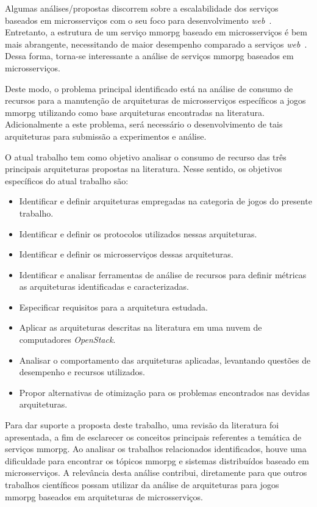Algumas análises/propostas discorrem sobre a escalabilidade dos serviços baseados em microsserviços com o seu foco para desenvolvimento \textit{web}~\cite{photon_engine, mmorpg_culture, DiFrancesco2017Apr}.
%
Entretanto, a estrutura de um serviço \ac{mmorpg} baseado em microsserviços é bem mais abrangente, necessitando de maior desempenho comparado a serviços \textit{web}~\cite{photon_engine, mmorpg_culture}.
%
Dessa forma, torna-se interessante a análise de serviços \ac{mmorpg} baseados em microsserviços.



Deste modo, o problema principal identificado está na análise de consumo de recursos para a manutenção de arquiteturas de microsserviços específicos a jogos \ac{mmorpg} utilizando como base arquiteturas encontradas na literatura.
%
Adicionalmente a este problema, será necessário o desenvolvimento de tais arquiteturas para submissão a experimentos e análise.

O atual trabalho tem como objetivo analisar o consumo de recurso das três principais arquiteturas propostas na literatura.
%
Nesse sentido, os objetivos específicos do atual trabalho são:

\begin{itemize}
    \item Identificar e definir arquiteturas empregadas na categoria de jogos do presente trabalho.
    \item Identificar e definir os protocolos utilizados nessas arquiteturas.
    \item Identificar e definir os microsserviços dessas arquiteturas.
    \item Identificar e analisar ferramentas de análise de recursos para definir métricas as arquiteturas identificadas e caracterizadas.
    \item Especificar requisitos para a arquitetura estudada.
    \item Aplicar as arquiteturas descritas na literatura em uma nuvem de computadores \textit{OpenStack}.
    \item Analisar o comportamento das arquiteturas aplicadas, levantando questões de desempenho e recursos utilizados.
    \item Propor alternativas de otimização para os problemas encontrados nas devidas arquiteturas.
\end{itemize}


Para dar suporte a proposta deste trabalho, uma revisão da literatura foi apresentada, a fim de esclarecer os conceitos principais referentes a temática de serviços \ac{mmorpg}.
%
Ao analisar os trabalhos relacionados identificados, houve uma dificuldade para encontrar os tópicos \ac{mmorpg} e sistemas distribuídos baseado em microsserviços.
%
A relevância desta análise contribui, diretamente para que outros trabalhos científicos possam utilizar da análise de arquiteturas para jogos \ac{mmorpg} baseados em arquiteturas de microsserviços.



